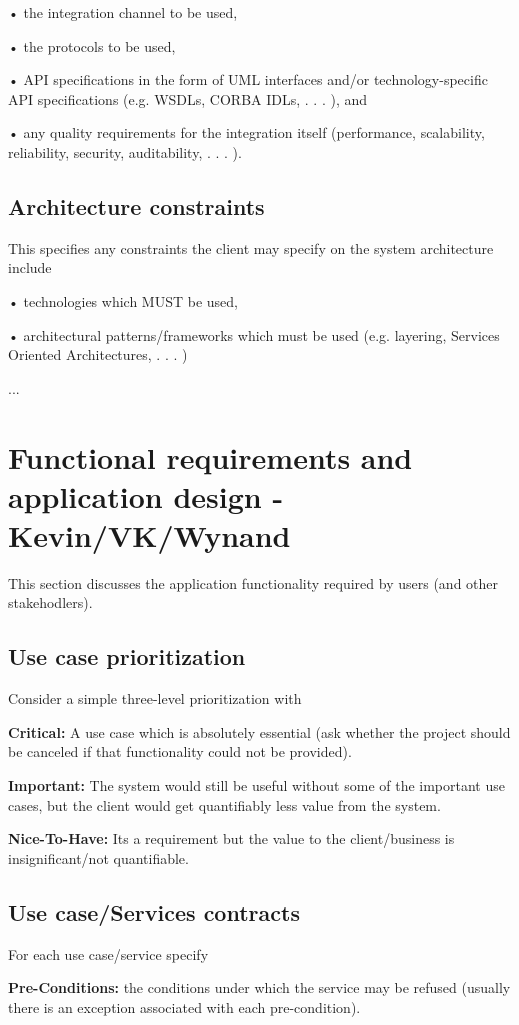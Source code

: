 \documentclass{scrreprt}
\begin{document}
• the integration channel to be used,

• the protocols to be used,


• API specifications in the form of UML interfaces and/or technology-specific API specifications (e.g. WSDLs, CORBA IDLs, . . . ), and

• any quality requirements for the integration itself (performance, scalability, reliability, security, auditability, . . . ).

\section{Architecture constraints}
	This specifies any constraints the client may specify on the system architecture include
	
• technologies which MUST be used,

• architectural patterns/frameworks which must be used (e.g. layering, Services Oriented Architectures, . . . )

...

\chapter{Functional requirements and application design - Kevin/VK/Wynand}
This section discusses the application functionality required by users (and other stakehodlers).

\section{Use case prioritization}
Consider a simple three-level prioritization with

\textbf{Critical:} A use case which is absolutely essential (ask whether the project should be canceled if that functionality could not be provided).

\textbf{Important:} The system would still be useful without some of the important use cases, but the client would get quantifiably less value from the system.

\textbf{Nice-To-Have:} Its a requirement but the value to the client/business is insignificant/not quantifiable.

\section{Use case/Services contracts}
For each use case/service specify

\textbf{Pre-Conditions:} the conditions under which the service may be refused (usually there is an exception associated with each pre-condition).
\end{document}
